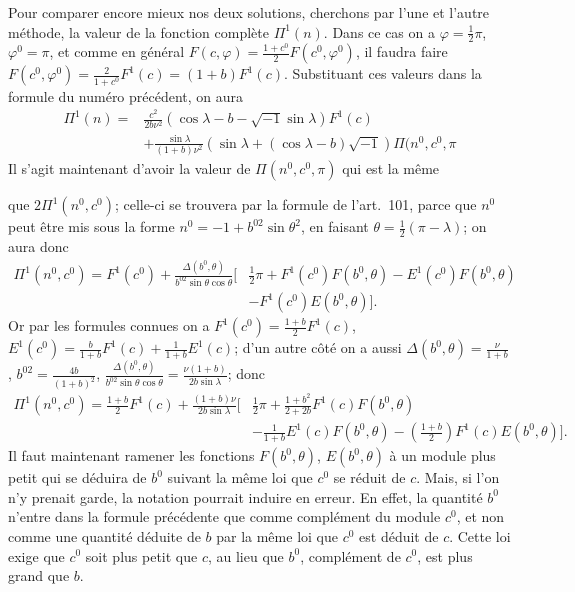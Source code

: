 \documentclass{article}
\begin{document}
Pour comparer encore mieux nos deux solutions, cherchons par l'une et l'autre méthode, la valeur de la fonction complète $\Pi^{1}(n)$. Dans ce cas on a $\varphi=\frac{1}{2}\pi$, $\varphi^{0}=\pi$, et comme en général $F(c,\varphi)=\frac{1+c^{0}}{2}F(c^{0},\varphi^{0})$, il faudra faire $F(c^{0},\varphi^{0})=\frac{2}{1+c^{0}}F^{1}(c)=(1+b)F^{1}(c)$. Substituant ces valeurs dans la formule du numéro précédent, on aura
\[ \begin{aligned} \Pi^{1}(n)={}&\frac{c^{2}}{2b\nu^{2}}(\cos\lambda-b-\sqrt{-1}\sin\lambda)F^{1}(c)\\ &+\frac{\sin\lambda}{(1+b)\nu^{2}}(\sin\lambda+(\cos\lambda-b)\sqrt{-1})\Pi(n^{0},c^{0},\pi \end{aligned} \]
Il s'agit maintenant d'avoir la valeur de $\Pi(n^{0},c^{0},\pi)$ qui est la même

que $2\Pi^{1}(n^{0},c^{0})$; celle-ci se trouvera par la formule de l'art.\ 101, parce que $n^{0}$ peut être mis sous la forme $n^{0}=-1+b^{02}\sin\theta^{2}$, en faisant $\theta=\frac{1}{2}(\pi-\lambda)$; on aura donc
\[ \begin{aligned} \Pi^{1}(n^{0},c^{0})=F^{1}(c^{0})+\frac{\Delta(b^{0},\theta)}{b^{02}\sin\theta\cos\theta}\Big[&\tfrac{1}{2}\pi+F^{1}(c^{0})F(b^{0},\theta)-E^{1}(c^{0})F(b^{0},\theta)\\ &-F^{1}(c^{0})E(b^{0},\theta)\Big]. \end{aligned} \]
Or par les formules connues on a $F^{1}(c^{0})=\frac{1+b}{2}F^{1}(c)$, $E^{1}(c^{0})=\frac{b}{1+b}F^{1}(c)+\frac{1}{1+b}E^{1}(c)$; d'un autre côté on a aussi $\Delta(b^{0},\theta)=\frac{\nu}{1+b}$, $b^{02}=\frac{4b}{(1+b)^{2}}$, $\frac{\Delta(b^{0},\theta)}{b^{02}\sin\theta\cos\theta}=\frac{\nu(1+b)}{2b\sin\lambda}$; donc
\[ \begin{aligned} \Pi^{1}(n^{0},c^{0})=\frac{1+b}{2}F^{1}(c)+\frac{(1+b)\nu}{2b\sin\lambda}\Big[&\tfrac{1}{2}\pi+\frac{1+b^{2}}{2+2b}F^{1}(c)F(b^{0},\theta)\\ &-\frac{1}{1+b}E^{1}(c)F(b^{0},\theta)-\left(\frac{1+b}{2}\right)F^{1}(c)E(b^{0},\theta)\Big]. \end{aligned} \]
Il faut maintenant ramener les fonctions $F(b^{0},\theta)$, $E(b^{0},\theta)$ à un module plus petit qui se déduira de $b^{0}$ suivant la même loi que $c^{0}$ se réduit de $c$. Mais, si l'on n'y prenait garde, la notation pourrait induire en erreur. En effet, la quantité $b^{0}$ n'entre dans la formule précédente que comme complément du module $c^{0}$, et non comme une quantité déduite de $b$ par la même loi que $c^{0}$ est déduit de $c$. Cette loi exige que $c^{0}$ soit plus petit que $c$, au lieu que $b^{0}$, complément de $c^{0}$, est plus grand que $b$.
\end{document}
